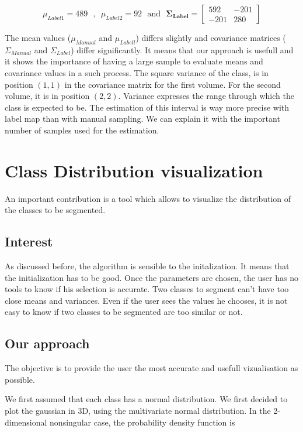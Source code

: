 \begin{equation*}
\mu_{Label1} =  489 \mbox{~~,~~} \mu_{Label2} =  92 \mbox{~~and~~} \mathbf{\Sigma_{Label}} = 
 \begin{bmatrix}
   592 & -201 \\
   -201 & 280
 \end{bmatrix}
\end{equation*}

\par
The mean values ($\mu_{Manual}$ and $\mu_{Labell}$) differs slightly and covariance matrices ($\Sigma_{Manual}$ and $\Sigma_{Label}$) differ significantly. It means that our approach is usefull and it shows the importance of having a large sample to evaluate means and covariance values in a such process. The square variance of the class, is in position $(1,1)$ in the covariance matrix for the first volume. For the second volume, it is in position $(2,2)$. Variance expresses the range through which the class is expected to be. The estimation of this interval is way more precise with label map than with manual sampling. We can explain it with the important number of samples used for the estimation.

%
\section{Class Distribution visualization}\label{sec:tables}

An important contribution is a tool which allows to visualize the distribution of the classes to be segmented.
\subsection{Interest}
As discussed before, the algorithm is sensible to the initalization. It means that the initialization has to be good. Once the parameters are chosen, the user has no tools to know if his selection is accurate. Two classes to segment can't have too close means and variances. Even if the user sees the values he chooses, it is not easy to know if two classes to be segmented are too similar or not.
\subsection{Our approach}
The objective is to provide the user the most accurate and usefull vizualisation as possible.
\par
We first assumed that each class has a normal distribution. We first decided to plot the gaussian in 3D, using the multivariate normal distribution.
In the 2-dimensional nonsingular case, the probability density function is 

